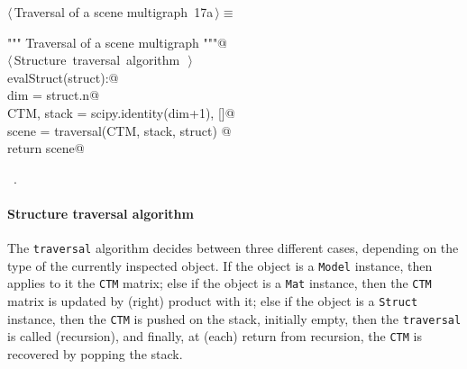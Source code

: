 \documentclass[11pt,oneside]{article}	%
\begin{document}
\begin{flushleft} \small \label{scrap31}
\protect{}$\langle\,$Traversal of a scene multigraph\nobreak\ {\footnotesize 17a}$\,\rangle\equiv$
\vspace{-1ex}
\begin{list}{}{} \item
\mbox{}\verb@""" Traversal of a scene multigraph """@\\
\mbox{}\verb@@\hbox{$\langle\,$Structure traversal algorithm\nobreak\ {\footnotesize {}}$\,\rangle$}\verb@@\\
\mbox{}\verb@def evalStruct(struct):@\\
\mbox{}\verb@    dim = struct.n@\\
\mbox{}\verb@    CTM, stack = scipy.identity(dim+1), []@\\
\mbox{}\verb@    scene = traversal(CTM, stack, struct) @\\
\mbox{}\verb@    return scene@\\
\mbox{}\verb@@{\NWsep}
\end{list}
\vspace{-1ex}
\footnotesize\addtolength{\baselineskip}{-1ex}
\begin{list}{}{\setlength{\itemsep}{-\parsep}\setlength{\itemindent}{-\leftmargin}}
\item \NWtxtMacroRefIn\ .
\end{list}
\end{flushleft}

\paragraph{Structure traversal algorithm}

The \texttt{traversal} algorithm decides between three different cases, depending on the type of the currently inspected object. If the object is a \texttt{Model} instance, then applies to it the \texttt{CTM} matrix; else if the object is a \texttt{Mat} instance, then the \texttt{CTM} matrix is updated by (right) product with it; else if the object is a \texttt{Struct} instance, then the \texttt{CTM} is pushed on the stack, initially empty, then the \texttt{traversal} is called (recursion), and finally, at (each) return from recursion, the \texttt{CTM} is recovered by popping the stack.
\end{document}
